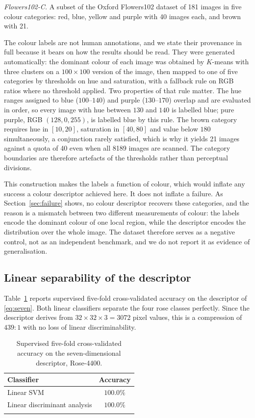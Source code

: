 \documentclass[pdflatex,sn-basic]{sn-jnl}
\theoremstyle{thmstyleone}%
\theoremstyle{thmstyletwo}%
\theoremstyle{thmstylethree}%
\begin{document}
\emph{Flowers102-C.} A subset of the Oxford Flowers102 dataset
\cite{ref:nilsback2008} of 181 images in five colour categories: red, blue,
yellow and purple with 40 images each, and brown with 21.

The colour labels are not human annotations, and we state their provenance in
full because it bears on how the results should be read. They were generated
automatically: the dominant colour of each image was obtained by $K$-means with
three clusters on a $100\times100$ version of the image, then mapped to one of
five categories by thresholds on hue and saturation, with a fallback rule on
RGB ratios where no threshold applied. Two properties of that rule matter. The
hue ranges assigned to blue ($100$--$140$) and purple ($130$--$170$) overlap and
are evaluated in order, so every image with hue between $130$ and $140$ is
labelled blue; pure purple, RGB $(128,0,255)$, is labelled blue by this rule.
The brown category requires hue in $[10,20]$, saturation in $[40,80]$ and value
below $180$ simultaneously, a conjunction rarely satisfied, which is why it
yields 21 images against a quota of 40 even when all 8189 images are scanned.
The category boundaries are therefore artefacts of the thresholds rather than
perceptual divisions.

This construction makes the labels a function of colour, which would inflate
any success a colour descriptor achieved here. It does not inflate a failure.
As Section~\ref{sec:failure} shows, no colour descriptor recovers these
categories, and the reason is a mismatch between two different measurements of
colour: the labels encode the dominant colour of one local region, while the
descriptor encodes the distribution over the whole image. The dataset therefore
serves as a negative control, not as an independent benchmark, and we do not
report it as evidence of generalisation.

\subsection{Linear separability of the descriptor}\label{sec:linear}

Table~\ref{tab:supervised} reports supervised five-fold cross-validated
accuracy on the descriptor of \eqref{eq:seven}. Both linear classifiers
separate the four rose classes perfectly. Since the descriptor derives from
$32\times32\times3=3072$ pixel values, this is a compression of $439{:}1$ with
no loss of linear discriminability.

\begin{table}[h]
\centering
\caption{Supervised five-fold cross-validated accuracy on the
seven-dimensional descriptor, Rose-4400.}\label{tab:supervised}
\begin{tabular}{@{}lc@{}}
\toprule
Classifier & Accuracy \\
\midrule
Linear SVM & $100.0\%$ \\
Linear discriminant analysis & $100.0\%$ \\
\botrule
\end{tabular}
\end{table}
\end{document}
